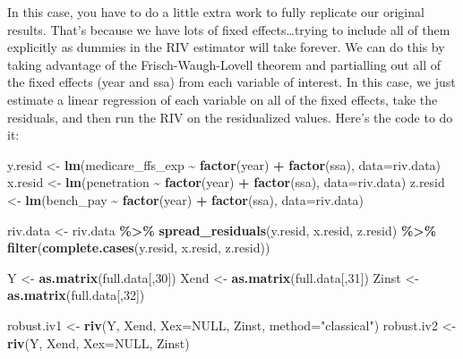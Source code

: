 \documentclass[
  12pt,
]{article}
\newenvironment{Shaded}{\begin{snugshade}}{\end{snugshade}}
\newcommand{\DataTypeTok}[1]{\textcolor[rgb]{0.13,0.29,0.53}{#1}}
\newcommand{\DecValTok}[1]{\textcolor[rgb]{0.00,0.00,0.81}{#1}}
\newcommand{\KeywordTok}[1]{\textcolor[rgb]{0.13,0.29,0.53}{\textbf{#1}}}
\newcommand{\NormalTok}[1]{#1}
\newcommand{\OperatorTok}[1]{\textcolor[rgb]{0.81,0.36,0.00}{\textbf{#1}}}
\newcommand{\OtherTok}[1]{\textcolor[rgb]{0.56,0.35,0.01}{#1}}
\newcommand{\StringTok}[1]{\textcolor[rgb]{0.31,0.60,0.02}{#1}}
\begin{document}
In this case, you have to do a little extra work to fully replicate our original results. That's because we have lots of fixed effects\ldots trying to include all of them explicitly as dummies in the RIV estimator will take forever. We can do this by taking advantage of the Frisch-Waugh-Lovell theorem and partialling out all of the fixed effects (year and ssa) from each variable of interest. In this case, we just estimate a linear regression of each variable on all of the fixed effects, take the residuals, and then run the RIV on the residualized values. Here's the code to do it:


\begin{Shaded}
\begin{Highlighting}[]
\NormalTok{y.resid \textless{}{-}}\StringTok{ }\KeywordTok{lm}\NormalTok{(medicare\_ffs\_exp }\OperatorTok{\textasciitilde{}}\StringTok{ }\KeywordTok{factor}\NormalTok{(year) }\OperatorTok{+}\StringTok{ }\KeywordTok{factor}\NormalTok{(ssa),}
                \DataTypeTok{data=}\NormalTok{riv.data)}
\NormalTok{x.resid \textless{}{-}}\StringTok{ }\KeywordTok{lm}\NormalTok{(penetration }\OperatorTok{\textasciitilde{}}\StringTok{ }\KeywordTok{factor}\NormalTok{(year) }\OperatorTok{+}\StringTok{ }\KeywordTok{factor}\NormalTok{(ssa),}
                \DataTypeTok{data=}\NormalTok{riv.data)}
\NormalTok{z.resid \textless{}{-}}\StringTok{ }\KeywordTok{lm}\NormalTok{(bench\_pay }\OperatorTok{\textasciitilde{}}\StringTok{ }\KeywordTok{factor}\NormalTok{(year) }\OperatorTok{+}\StringTok{ }\KeywordTok{factor}\NormalTok{(ssa),}
                \DataTypeTok{data=}\NormalTok{riv.data)}

\NormalTok{riv.data \textless{}{-}}\StringTok{ }\NormalTok{riv.data }\OperatorTok{\%\textgreater{}\%}
\StringTok{  }\KeywordTok{spread\_residuals}\NormalTok{(y.resid, x.resid, z.resid) }\OperatorTok{\%\textgreater{}\%}
\StringTok{  }\KeywordTok{filter}\NormalTok{(}\KeywordTok{complete.cases}\NormalTok{(y.resid, x.resid, z.resid))}


\NormalTok{Y \textless{}{-}}\StringTok{ }\KeywordTok{as.matrix}\NormalTok{(full.data[,}\DecValTok{30}\NormalTok{])}
\NormalTok{Xend \textless{}{-}}\StringTok{ }\KeywordTok{as.matrix}\NormalTok{(full.data[,}\DecValTok{31}\NormalTok{])}
\NormalTok{Zinst \textless{}{-}}\StringTok{ }\KeywordTok{as.matrix}\NormalTok{(full.data[,}\DecValTok{32}\NormalTok{])}

\NormalTok{robust.iv1 \textless{}{-}}\StringTok{ }\KeywordTok{riv}\NormalTok{(Y, Xend, }\DataTypeTok{Xex=}\OtherTok{NULL}\NormalTok{, Zinst, }\DataTypeTok{method=}\StringTok{"classical"}\NormalTok{)}
\NormalTok{robust.iv2 \textless{}{-}}\StringTok{ }\KeywordTok{riv}\NormalTok{(Y, Xend, }\DataTypeTok{Xex=}\OtherTok{NULL}\NormalTok{, Zinst)}
\end{Highlighting}
\end{Shaded}
\end{document}
